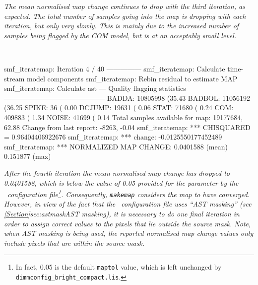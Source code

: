 \begin{terminalv}
\emph{The mean normalised map change continues to drop with the third
iteration, as expected. The total number of samples going into the map is
dropping with each iteration, but only very slowly. This is mainly due to
the increased number of samples being flagged by the COM model, but is at
an acceptably small level.}

~
\begin{terminalv}
smf_iteratemap: Iteration 4 / 40 ---------------
smf_iteratemap: Calculate time-stream model components
smf_iteratemap: Rebin residual to estimate MAP
smf_iteratemap: Calculate ast
--- Quality flagging statistics --------------------------------------------
 BADDA:   10805998 (35.43%
BADBOL:   11056192 (36.25%
 SPIKE:         36 ( 0.00%
DCJUMP:      19631 ( 0.06%
  STAT:      71680 ( 0.24%
   COM:     409883 ( 1.34%
 NOISE:      41699 ( 0.14%
Total samples available for map:   19177684, 62.88%
     Change from last report:      -8263, -0.04%
smf_iteratemap: *** CHISQUARED = 0.96404406922676
smf_iteratemap: *** change: -0.0125550177452489
smf_iteratemap: *** NORMALIZED MAP CHANGE: 0.0401588 (mean) 0.151877 (max)
\end{terminalv}

\emph{After the fourth iteration the mean normalised map change has
dropped to 0.0401588, which is below the value of 0.05 provided for the
 parameter by the \brightcompact\
configuration file\footnote{In fact, 0.05 is the default \texttt{maptol}
value, which is left unchanged by \texttt{dimmconfig\_bright\_compact.lis}.}.
Consequently, \texttt{makemap} considers the map to have converged. However,
in view of the fact that the \brightcompact\ configuration file uses
``AST masking'' (see \cref{Section}{sec:astmask}{AST masking}), it is
necessary to do one final iteration in order to assign correct values to
the pixels that lie outside the source mask. Note, when AST masking is being
used, the reported normalised map change values only include pixels that
are within the source mask.}


\end{terminalv}
